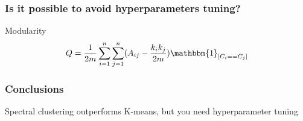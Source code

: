 \documentclass{beamer}
\begin{document}
\begin{frame}
  \frametitle{Is it possible to avoid hyperparameters tuning?}
  \begin{block}{Modularity}
    \[ Q = \frac{1}{2m} \sum_{i=1}^n \sum_{j=1}^n (A_{ij} - \frac{k_i k_j}{2m}) \mathbbm{1}_{[C_i == C_j]} \]
  \end{block}

  \begin{figure}
    \hfill
    \hfill
  \end{figure}
\end{frame}

\begin{frame}
  \frametitle{Conclusions}
  Spectral clustering outperforms K-means, but you need hyperparameter tuning
\end{frame}
\end{document}
